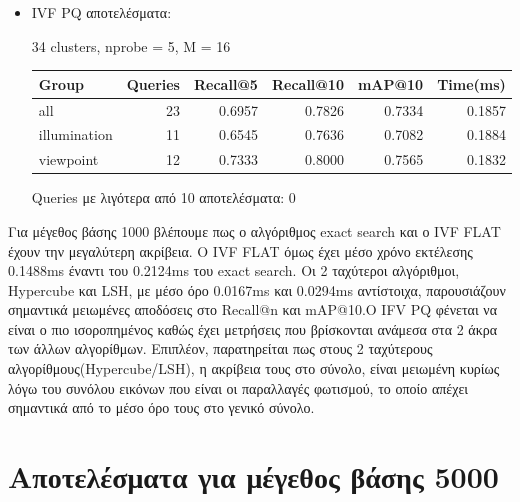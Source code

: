 \documentclass [conference]{IEEEtran}
\begin{document}
\begin{itemize}
    \item IVF PQ αποτελέσματα:
        \begin{table}[H]
        \centering
        \small
        \setlength{\tabcolsep}{3pt}
        34 clusters, nprobe = 5, M = 16
        \par\smallskip
        \begin{tabular}{l r r r r r}
        \hline
        \textbf{Group} & \textbf{Queries} & \textbf{Recall@5} & \textbf{Recall@10} & \textbf{mAP@10} & \textbf{Time(ms)} \\
        \hline
        all & 23 & 0.6957 & 0.7826 & 0.7334 & 0.1857 \\
        illumination & 11 & 0.6545 & 0.7636 & 0.7082 & 0.1884 \\
        viewpoint & 12 & 0.7333 & 0.8000 & 0.7565 & 0.1832 \\
        \hline
        \end{tabular}
        \par\smallskip
        \footnotesize Queries με λιγότερα από 10 αποτελέσματα: 0
        \end{table}

    
\end{itemize}

Για μέγεθος βάσης 1000 βλέπουμε πως ο αλγόριθμος exact search και ο IVF FLAT έχουν την μεγαλύτερη ακρίβεια. Ο IVF FLAT όμως έχει μέσο χρόνο εκτέλεσης 0.1488ms έναντι του 0.2124ms του exact search. Οι 2 ταχύτεροι αλγόριθμοι, Hypercube και LSH, με μέσο όρο 0.0167ms και 0.0294ms αντίστοιχα, παρουσιάζουν σημαντικά μειωμένες αποδόσεις στο Recall@n και mAP@10.O IFV PQ φένεται να είναι ο πιο ισοροπημένος καθώς έχει μετρήσεις που βρίσκονται ανάμεσα στα 2 άκρα των άλλων αλγορίθμων. Επιπλέον, παρατηρείται πως στους 2 ταχύτερους αλγορίθμους(Hypercube/LSH), η ακρίβεια τους στο σύνολο, είναι μειωμένη κυρίως λόγω του συνόλου εικόνων που είναι οι παραλλαγές φωτισμού, το οποίο απέχει σημαντικά από το μέσο όρο τους στο γενικό σύνολο.

\section{Αποτελέσματα για μέγεθος βάσης 5000}
\end{document}
